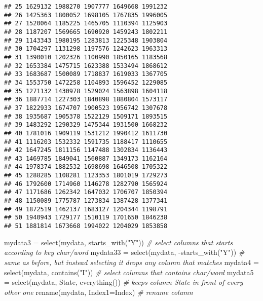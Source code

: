 \documentclass[
]{article}
\newenvironment{Shaded}{\begin{snugshade}}{\end{snugshade}}
\newcommand{\AttributeTok}[1]{\textcolor[rgb]{0.77,0.63,0.00}{#1}}
\newcommand{\CommentTok}[1]{\textcolor[rgb]{0.56,0.35,0.01}{\textit{#1}}}
\newcommand{\FunctionTok}[1]{\textcolor[rgb]{0.00,0.00,0.00}{#1}}
\newcommand{\NormalTok}[1]{#1}
\newcommand{\OtherTok}[1]{\textcolor[rgb]{0.56,0.35,0.01}{#1}}
\newcommand{\SpecialCharTok}[1]{\textcolor[rgb]{0.00,0.00,0.00}{#1}}
\newcommand{\StringTok}[1]{\textcolor[rgb]{0.31,0.60,0.02}{#1}}
\begin{document}
\begin{verbatim}
## 25 1629132 1988270 1907777 1649668 1991232
## 26 1425363 1800052 1698105 1767835 1996005
## 27 1520064 1185225 1465705 1110394 1125903
## 28 1187207 1569665 1690920 1459243 1802211
## 29 1143343 1980195 1283813 1225348 1903804
## 30 1704297 1131298 1197576 1242623 1963313
## 31 1390010 1202326 1100990 1850165 1183568
## 32 1653384 1475715 1623388 1533494 1868612
## 33 1683687 1500089 1718837 1619033 1367705
## 34 1553750 1472258 1104893 1596452 1229085
## 35 1271132 1430978 1529024 1563898 1604118
## 36 1887714 1227303 1840898 1880804 1573117
## 37 1822933 1674707 1900523 1956742 1307678
## 38 1935687 1905378 1522129 1509171 1893515
## 39 1483292 1290329 1475344 1931500 1668232
## 40 1781016 1909119 1531212 1990412 1611730
## 41 1116203 1532332 1591735 1188417 1110655
## 42 1647245 1811156 1147488 1302834 1136443
## 43 1469785 1849041 1560887 1349173 1162164
## 44 1978374 1882532 1698698 1646508 1705322
## 45 1288285 1108281 1123353 1801019 1729273
## 46 1792600 1714960 1146278 1282790 1565924
## 47 1171686 1262342 1647032 1706707 1850394
## 48 1150089 1775787 1273834 1387428 1377341
## 49 1872519 1462137 1683127 1204344 1198791
## 50 1940943 1729177 1510119 1701650 1846238
## 51 1881814 1673668 1994022 1204029 1853858
\end{verbatim}

\begin{Shaded}
\begin{Highlighting}[]
\NormalTok{mydata3 }\OtherTok{=} \FunctionTok{select}\NormalTok{(mydata, }\FunctionTok{starts\_with}\NormalTok{(}\StringTok{"Y"}\NormalTok{)) }\CommentTok{\# select columns that starts according to key char/word}
\NormalTok{mydata33 }\OtherTok{=} \FunctionTok{select}\NormalTok{(mydata, }\SpecialCharTok{{-}}\FunctionTok{starts\_with}\NormalTok{(}\StringTok{"Y"}\NormalTok{)) }\CommentTok{\# same as before, but instead selecting it drops any column that matches}
\NormalTok{mydata4 }\OtherTok{=} \FunctionTok{select}\NormalTok{(mydata, }\FunctionTok{contains}\NormalTok{(}\StringTok{"I"}\NormalTok{)) }\CommentTok{\# select columns that contains char/word}
\NormalTok{mydata5 }\OtherTok{=} \FunctionTok{select}\NormalTok{(mydata, State, }\FunctionTok{everything}\NormalTok{()) }\CommentTok{\# keeps column State in front of every other one}
\FunctionTok{rename}\NormalTok{(mydata, }\AttributeTok{Index1=}\NormalTok{Index) }\CommentTok{\# rename column}
\end{Highlighting}
\end{Shaded}
\end{document}
